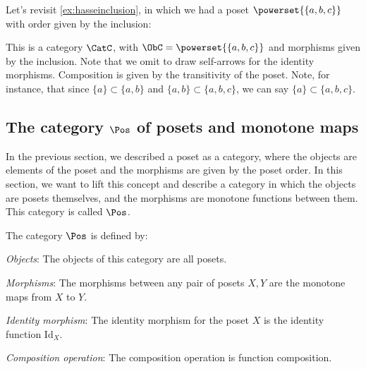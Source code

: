 \begin{example}
Let's revisit \cref{ex:hasseinclusion}, in which we had a poset $\powerset{\{a,b,c\}}$ with order given by the inclusion:
\begin{center}
\end{center}
This is a category $\CatC$, with $\ObC=\powerset{\{a,b,c\}}$ and morphisms given by the inclusion. Note that we omit to draw self-arrows for the identity morphisms. Composition is given by the transitivity of the poset. Note, for instance, that since $\{a\}\subset \{a,b\}$ and $\{a,b\} \subset \{a,b,c\}$, we can say $\{a\}\subset \{a,b,c\}$.
\end{example}




\subsection{The category $\Pos$ of posets and monotone maps}
In the previous section, we described a poset as a category, where the objects are elements of the poset and the morphisms are given by the poset order. In this section, we want to lift this concept and describe a category in which the objects are posets themselves, and the morphisms are monotone functions between them. This category is called $\Pos$.

\begin{definition}
    The category $\Pos$ is defined by:
    \begin{compactenum}
    \item \emph{Objects}: The objects of this category are all posets.
    \item \emph{Morphisms}: The morphisms between any pair of posets $X, Y$
    are the monotone maps from $X$ to $Y$.
    \item \emph{Identity morphism}:  The identity morphism for the poset $X$
    is the identity function $\text{Id}_X$.
    \item \emph{Composition operation}: The composition operation is function
    composition.
    \end{compactenum}
\end{definition}


